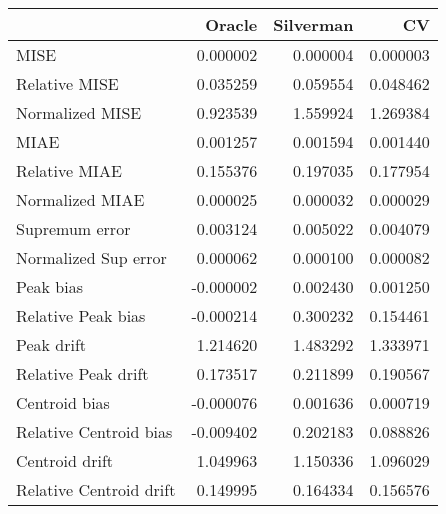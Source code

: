 \begin{tabular}{lrrr}
  \toprule
 & Oracle & Silverman & CV \\ 
  \midrule
MISE & 0.000002 & 0.000004 & 0.000003 \\ 
  Relative MISE & 0.035259 & 0.059554 & 0.048462 \\ 
  Normalized MISE & 0.923539 & 1.559924 & 1.269384 \\ 
  MIAE & 0.001257 & 0.001594 & 0.001440 \\ 
  Relative MIAE & 0.155376 & 0.197035 & 0.177954 \\ 
  Normalized MIAE & 0.000025 & 0.000032 & 0.000029 \\ 
  Supremum error & 0.003124 & 0.005022 & 0.004079 \\ 
  Normalized Sup error & 0.000062 & 0.000100 & 0.000082 \\ 
  Peak bias & -0.000002 & 0.002430 & 0.001250 \\ 
  Relative Peak bias & -0.000214 & 0.300232 & 0.154461 \\ 
  Peak drift & 1.214620 & 1.483292 & 1.333971 \\ 
  Relative Peak drift & 0.173517 & 0.211899 & 0.190567 \\ 
  Centroid bias & -0.000076 & 0.001636 & 0.000719 \\ 
  Relative Centroid bias & -0.009402 & 0.202183 & 0.088826 \\ 
  Centroid drift & 1.049963 & 1.150336 & 1.096029 \\ 
  Relative Centroid drift & 0.149995 & 0.164334 & 0.156576 \\ 
   \bottomrule
\end{tabular}
